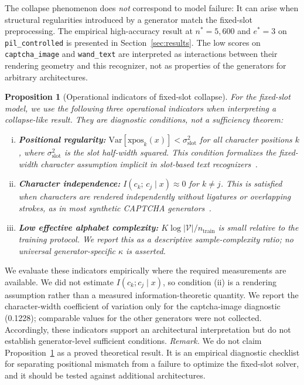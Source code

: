 \documentclass[pdflatex,sn-mathphys-num,iicol]{sn-jnl}
\newtheorem{proposition}{Proposition}
\begin{document}
\noindent The collapse phenomenon does \emph{not} correspond to model failure:
It can arise when structural regularities introduced by a generator match the fixed-slot preprocessing. The empirical high-accuracy result at $n^*=5{,}600$ and $e^*=3$ on \texttt{pil\_controlled} is presented in Section~\ref{sec:results}. The low scores on \texttt{captcha\_image} and \texttt{wand\_text} are interpreted as interactions between their rendering geometry and this recognizer, not as properties of the generators for arbitrary architectures.

\begin{proposition}[Operational indicators of fixed-slot collapse]
\label{thm:collapse}
For the fixed-slot model, we use the following three operational indicators when interpreting a collapse-like result. They are diagnostic conditions, not a sufficiency theorem:
\begin{enumerate}[(i)]
  \item \textbf{Positional regularity:} $\mathrm{Var}[\mathrm{xpos}_k(x)] <
        \sigma^2_{\mathrm{slot}}$ for all character positions $k$, where
        $\sigma^2_{\mathrm{slot}}$ is the slot half-width squared. This
        condition formalizes the fixed-width character assumption implicit
        in slot-based text recognizers~\cite{shi2017crnn}.
  \item \textbf{Character independence:} $I(c_k;\, c_j \mid x) \approx 0$
        for $k \neq j$. This is satisfied when characters are rendered
        independently without ligatures or overlapping strokes, as in most
        synthetic CAPTCHA generators~\cite{vonahn2003captcha,ye2018captcha}.
  \item \textbf{Low effective alphabet complexity:}
        $K\log |\mathcal{V}| / n_{\mathrm{train}}$ is small relative to the
        training protocol. We report this as a descriptive sample-complexity
        ratio; no universal generator-specific $\kappa$ is asserted.
\end{enumerate}
\end{proposition}
We evaluate these indicators empirically where the required measurements are available. We did not estimate $I(c_k;c_j\mid x)$, so condition (ii) is a rendering assumption rather than a measured information-theoretic quantity. We report the character-width coefficient of variation only for the captcha-image diagnostic (0.1228); comparable values for the other generators were not collected. Accordingly, these indicators support an architectural interpretation but do not establish generator-level sufficient conditions.
\noindent\textit{Remark.} We do not claim Proposition~\ref{thm:collapse} as a
proved theoretical result. It is an empirical diagnostic checklist for
separating positional mismatch from a failure to optimize the fixed-slot
solver, and it should be tested against additional architectures.
\end{document}
